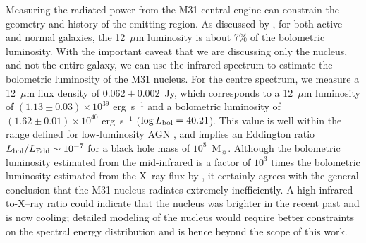 Measuring the radiated power from the M31 central engine can constrain the geometry and history of the emitting region. 
As discussed by \citet{spinoglio95}, for both active and normal galaxies, the 12~$\mu$m luminosity 
is about 7\% of the bolometric luminosity. With the important caveat that we are discussing only the nucleus,
and not the entire galaxy, we  can use the infrared spectrum to estimate the bolometric luminosity  of the M31 nucleus.
For the centre spectrum, we measure a 12~$\mu$m flux density of 
$0.062 \pm 0.002$~Jy, which corresponds to a 12~$\mu$m luminosity of $(1.13\pm0.03) \times10^{39}$ erg~s$^{-1}$ and a bolometric luminosity
of  $(1.62\pm0.01) \times10^{40}$ erg~s$^{-1}$ ($\log L_{\rm bol} = 40.21$). 
This value is well within the range defined for low-luminosity AGN \citep[$\log L_{\rm bol} <42$][]{Mason2012}, and
implies an Eddington ratio $L_{\rm bol}/L_{\rm Edd} \sim 10^{-7}$ for a black hole mass of $10^8$~M$_{\sun}$. 
Although the bolometric luminosity estimated from the mid-infrared is a factor of $10^3$ times the bolometric
luminosity estimated from the X--ray flux by \citet{Li09}, it certainly agrees with the general conclusion that the M31 nucleus radiates extremely inefficiently.
A high infrared-to-X--ray ratio could indicate that the nucleus was brighter in the recent past and is now cooling;
detailed modeling of the nucleus would require better constraints on the spectral energy distribution and is hence beyond the scope of this work.

